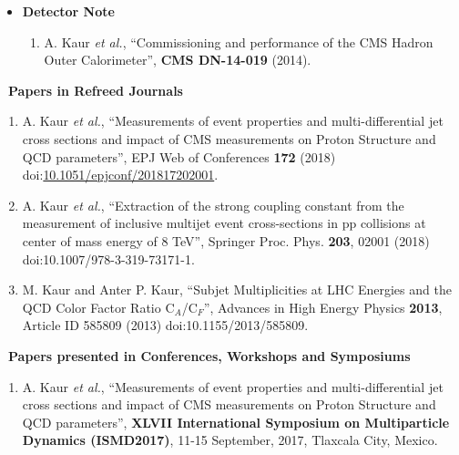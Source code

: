 \begin{itemize}
\begin{itemize}
\begin{enumerate}
\end{enumerate}
\vspace*{2mm}
\item {\large \bf Detector Note} 
\begin{enumerate}

\item A. Kaur {\it et al.}, ``Commissioning and performance of the CMS Hadron Outer Calorimeter'', {\bf CMS DN-14-019} (2014).

\end{enumerate}
\end{itemize}
\vspace*{3mm}

{\Large \item {\bf ~Papers in Refreed Journals}}
\begin{enumerate}

\item A. Kaur {\it et al.}, ``Measurements of event properties and multi-differential jet cross sections and impact of CMS measurements on Proton Structure and QCD parameters'', EPJ Web of Conferences {\bf 172} (2018) doi:\href{https://doi.org/10.1051/epjconf/201817202001}{10.1051/epjconf/201817202001}.

\item A. Kaur {\it et al.}, ``Extraction of the strong coupling constant from the measurement of inclusive multijet event cross-sections in pp collisions at center of mass energy of 8 TeV'', Springer Proc. Phys. {\bf 203}, 02001 (2018) doi:10.1007/978-3-319-73171-1.

\item M. Kaur and Anter P. Kaur, ``Subjet Multiplicities at LHC Energies and the QCD Color Factor Ratio C$_{A}$/C$_{F}$'', Advances in High Energy Physics {\bf 2013}, Article ID 585809 (2013) doi:10.1155/2013/585809.
\
\end{enumerate}
\vspace*{3mm}

{\Large \item {\bf ~Papers presented in Conferences, Workshops and Symposiums}}
\begin{enumerate}
\item A. Kaur {\it et al.}, ``Measurements of event properties and multi-differential jet cross sections and impact of CMS measurements on Proton Structure and QCD parameters'', {\bf XLVII International Symposium on Multiparticle Dynamics (ISMD2017)}, 11-15 September, 2017, Tlaxcala City, Mexico.


\end{enumerate}
\end{itemize}
